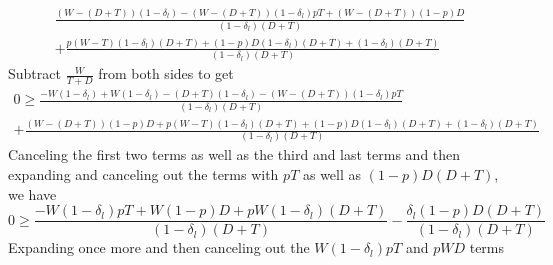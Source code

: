 \documentclass[12pt, letterpaper]{article}
\newcommand{\de}{\delta}
\begin{document}
{\begin{multline*}
	\frac{(W-(D+T))\left(1-\de_l\right) - (W-(D+T))\left(1-\de_l\right)pT +(W-(D+T))(1-p) D }{\left(1-\de_l\right)\left(D +	 T\right)} \\ 
	+ \frac{p(W-T)\left(1-\de_l\right)\left(D +	 T\right) + (1-p)D\left(1-\de_l\right)\left(D +	 T\right) + \left(1-\de_l\right)\left(D +	 T\right)}{\left(1-\de_l\right)\left(D +	 T\right)}
\end{multline*}
Subtract $\frac{W}{T+D}$ from both sides to get
\begin{multline*}
	0 \geq \frac{-W(1-\de_l) + W\left(1-\de_l\right)-(D+T)\left(1-\de_l\right) - (W-(D+T))\left(1-\de_l\right)pT}{\left(1-\de_l\right)\left(D +	 T\right)} \\ 
	+ \frac{(W-(D+T))(1-p) D + p(W-T)\left(1-\de_l\right)\left(D +	 T\right) + (1-p)D\left(1-\de_l\right)\left(D +	 T\right) + \left(1-\de_l\right)\left(D +	 T\right)}{\left(1-\de_l\right)\left(D +	 T\right)}
\end{multline*}
Canceling the first two terms as well as the third and last terms and then 
expanding and canceling out the terms with $pT$ as well as $(1-p)D\left(D +	 T\right)$, we have
\begin{equation*}
	0 \geq \frac{-W\left(1-\de_l\right)pT +W(1-p) D + pW\left(1-\de_l\right)\left(D +	 T\right) }{\left(1-\de_l\right)\left(D +	 T\right)} 
	- \frac{\de_l (1-p)D\left(D +	 T\right)}{\left(1-\de_l\right)\left(D +	 T\right)}
\end{equation*}
Expanding once more and then canceling out the $W\left(1-\de_l\right)pT$ and $pWD$ terms
}
\end{document}
